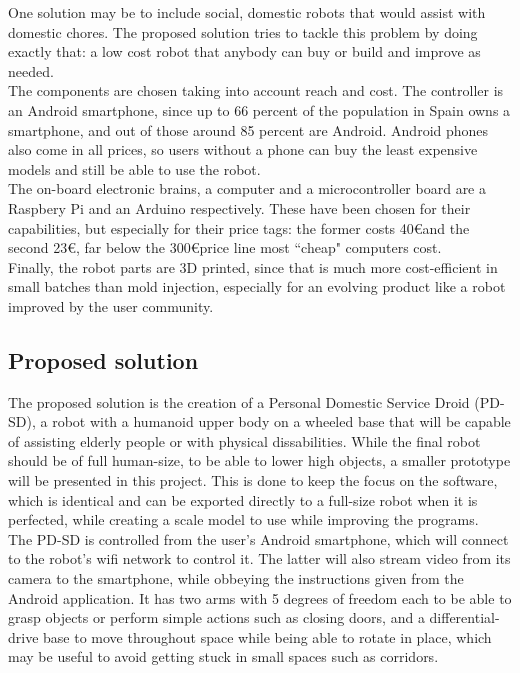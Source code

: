 One solution may be to include social, domestic robots that would assist with domestic chores. The proposed solution tries to tackle this problem by doing exactly that: a low cost robot that anybody can buy or build and improve as needed.\\

The components are chosen taking into account reach and cost. The controller is an Android smartphone, since up to 66 percent of the population in Spain owns a smartphone\cite{numero-smartphone}, and out of those around 85 percent are Android\cite{numero-android}. Android phones also come in all prices, so users without a phone can buy the least expensive models and still be able to use the robot.\\

The on-board electronic brains, a computer and a microcontroller board are a Raspbery Pi and an Arduino respectively. These have been chosen for their capabilities, but especially for their price tags: the former costs 40\euro  and the second 23\euro, far below the 300\euro price line most ``cheap" computers cost.\\

Finally, the robot parts are 3D printed, since that is much more cost-efficient in small batches than mold injection, especially for an evolving product like a robot improved by the user community.


\subsection{Proposed solution}
The proposed solution is the creation of a Personal Domestic Service Droid (PD-SD), a robot with a humanoid upper body on a wheeled base that will be capable of assisting elderly people or with physical dissabilities. While the final robot should be of full human-size, to be able to lower high objects, a smaller prototype will be presented in this project. This is done to keep the focus on the software, which is identical and can be exported directly to a full-size robot when it is perfected, while creating a scale model to use while improving the programs.\\

The PD-SD is controlled from the user's Android smartphone, which will connect to the robot's wifi network to control it. The latter will also stream video from its camera to the smartphone, while obbeying the instructions given from the Android application. It has two arms with 5 degrees of freedom each to be able to grasp objects or perform simple actions such as closing doors, and a differential-drive base to move throughout space while being able to rotate in place, which may be useful to avoid getting stuck in small spaces such as corridors.\\










